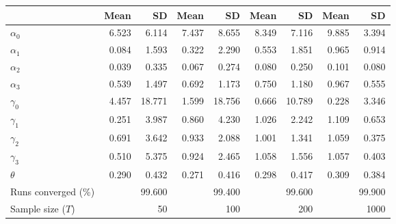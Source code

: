 
\begin{tabular}[t]{lrrrrrrrr}
\toprule
  & Mean & SD & Mean  & SD  & Mean   & SD   & Mean    & SD   \\
\midrule
$\alpha_{0}$ & 6.523 & 6.114 & 7.437 & 8.655 & 8.349 & 7.116 & 9.885 & 3.394\\
$\alpha_{1}$ & 0.084 & 1.593 & 0.322 & 2.290 & 0.553 & 1.851 & 0.965 & 0.914\\
$\alpha_{2}$ & 0.039 & 0.335 & 0.067 & 0.274 & 0.080 & 0.250 & 0.101 & 0.080\\
$\alpha_{3}$ & 0.539 & 1.497 & 0.692 & 1.173 & 0.750 & 1.180 & 0.967 & 0.555\\
$\gamma_{0}$ & 4.457 & 18.771 & 1.599 & 18.756 & 0.666 & 10.789 & 0.228 & 3.346\\
$\gamma_{1}$ & 0.251 & 3.987 & 0.860 & 4.230 & 1.026 & 2.242 & 1.109 & 0.653\\
$\gamma_{2}$ & 0.691 & 3.642 & 0.933 & 2.088 & 1.001 & 1.341 & 1.059 & 0.375\\
$\gamma_{3}$ & 0.510 & 5.375 & 0.924 & 2.465 & 1.058 & 1.556 & 1.057 & 0.403\\
$\theta$ & 0.290 & 0.432 & 0.271 & 0.416 & 0.298 & 0.417 & 0.309 & 0.384\\
Runs converged (\%) &  & 99.600 &  & 99.400 &  & 99.600 &  & 99.900\\
Sample size ($T$) &  & 50 &  & 100 &  & 200 &  & 1000\\
\bottomrule
\end{tabular}
